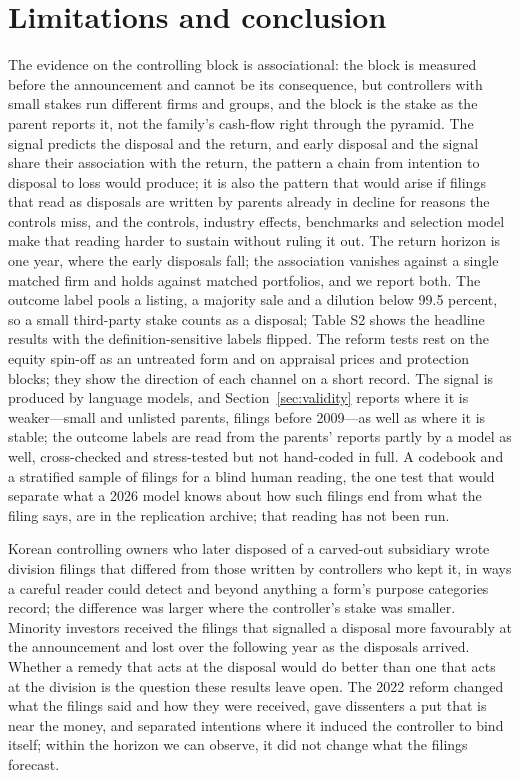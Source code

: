 \section{Limitations and conclusion}\label{sec:conclusion}

The evidence on the controlling block is associational: the block is measured before the announcement and cannot be its consequence, but controllers with small stakes run different firms and groups, and the block is the stake as the parent reports it, not the family's cash-flow right through the pyramid. The signal predicts the disposal and the return, and early disposal and the signal share their association with the return, the pattern a chain from intention to disposal to loss would produce; it is also the pattern that would arise if filings that read as disposals are written by parents already in decline for reasons the controls miss, and the controls, industry effects, benchmarks and selection model make that reading harder to sustain without ruling it out. The return horizon is one year, where the early disposals fall; the association vanishes against a single matched firm and holds against matched portfolios, and we report both. The outcome label pools a listing, a majority sale and a dilution below 99.5 percent, so a small third-party stake counts as a disposal; Table S2 shows the headline results with the definition-sensitive labels flipped. The reform tests rest on the equity spin-off as an untreated form and on \AppraisalPrices{} appraisal prices and \ProtPostN{} protection blocks; they show the direction of each channel on a short record. The signal is produced by language models, and Section~\ref{sec:validity} reports where it is weaker---small and unlisted parents, filings before 2009---as well as where it is stable; the outcome labels are read from the parents' reports partly by a model as well, cross-checked and stress-tested but not hand-coded in full. A codebook and a stratified sample of filings for a blind human reading, the one test that would separate what a 2026 model knows about how such filings end from what the filing says, are in the replication archive; that reading has not been run.

Korean controlling owners who later disposed of a carved-out subsidiary wrote division filings that differed from those written by controllers who kept it, in ways a careful reader could detect and beyond anything a form's purpose categories record; the difference was larger where the controller's stake was smaller. Minority investors received the filings that signalled a disposal more favourably at the announcement and lost over the following year as the disposals arrived. Whether a remedy that acts at the disposal would do better than one that acts at the division is the question these results leave open. The 2022 reform changed what the filings said and how they were received, gave dissenters a put that is near the money, and separated intentions where it induced the controller to bind itself; within the horizon we can observe, it did not change what the filings forecast.
